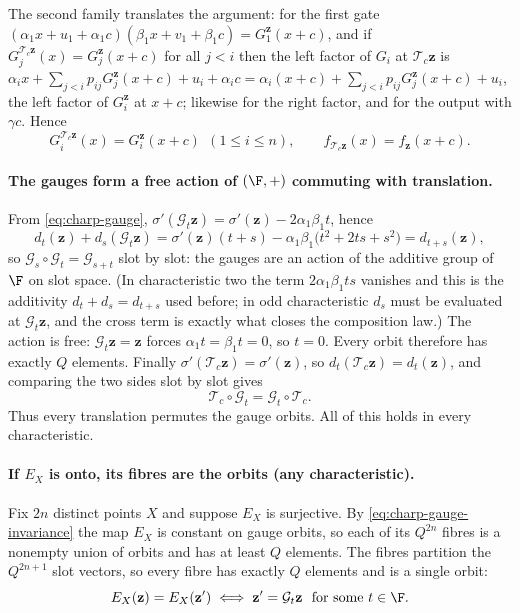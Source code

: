 The second family translates the argument: for the first gate
$(\alpha_1x+u_1+\alpha_1c)(\beta_1x+v_1+\beta_1c)=G_1^{\mathbf z}(x+c)$, and if
$G_j^{\mathcal T_c\mathbf z}(x)=G_j^{\mathbf z}(x+c)$ for all $j<i$ then the left factor of
$G_i$ at $\mathcal T_c\mathbf z$ is
$\alpha_ix+\sum_{j<i}p_{ij}G_j^{\mathbf z}(x+c)+u_i+\alpha_ic
=\alpha_i(x+c)+\sum_{j<i}p_{ij}G_j^{\mathbf z}(x+c)+u_i$, the left factor of $G_i^{\mathbf z}$
at $x+c$; likewise for the right factor, and for the output with $\gamma c$.  Hence
\begin{equation}
   G_i^{\mathcal T_c\mathbf z}(x)=G_i^{\mathbf z}(x+c)\ \ (1\le i\le n),
   \qquad
   f_{\mathcal T_c\mathbf z}(x)=f_{\mathbf z}(x+c).
   \label{eq:charp-translation}
\end{equation}

\paragraph{The gauges form a free action of $(\F,+)$ commuting with translation.}
From \eqref{eq:charp-gauge},
$\sigma'(\mathcal G_t\mathbf z)=\sigma'(\mathbf z)-2\alpha_1\beta_1t$, hence
\[
   d_t(\mathbf z)+d_s(\mathcal G_t\mathbf z)
   =\sigma'(\mathbf z)(t+s)-\alpha_1\beta_1\bigl(t^2+2ts+s^2\bigr)
   =d_{t+s}(\mathbf z),
\]
so $\mathcal G_s\circ\mathcal G_t=\mathcal G_{s+t}$ slot by slot: the gauges are an action
of the additive group of $\F$ on slot space.  (In characteristic two the term
$2\alpha_1\beta_1ts$ vanishes and this is the additivity $d_t+d_s=d_{t+s}$ used before; in
odd characteristic $d_s$ must be evaluated at $\mathcal G_t\mathbf z$, and the cross term
is exactly what closes the composition law.)  The action is free: $\mathcal G_t\mathbf
z=\mathbf z$ forces $\alpha_1t=\beta_1t=0$, so $t=0$.  Every orbit therefore has exactly
$Q$ elements.  Finally $\sigma'(\mathcal T_c\mathbf z)=\sigma'(\mathbf z)$, so
$d_t(\mathcal T_c\mathbf z)=d_t(\mathbf z)$, and comparing the two sides slot by slot gives
\begin{equation}
   \mathcal T_c\circ\mathcal G_t=\mathcal G_t\circ\mathcal T_c .
   \label{eq:charp-commute}
\end{equation}
Thus every translation permutes the gauge orbits.  All of this holds in every
characteristic.

\paragraph{If $E_X$ is onto, its fibres are the orbits (any characteristic).}
Fix $2n$ distinct points $X$ and suppose $E_X$ is surjective.  By
\eqref{eq:charp-gauge-invariance} the map $E_X$ is constant on gauge orbits, so each of its
$Q^{2n}$ fibres is a nonempty union of orbits and has at least $Q$ elements.  The fibres
partition the $Q^{2n+1}$ slot vectors, so every fibre has exactly $Q$ elements and is a
single orbit:
\begin{equation}
   E_X(\mathbf z)=E_X(\mathbf z')
   \iff
   \mathbf z'=\mathcal G_t\mathbf z\ \text{ for some } t\in\F .
   \label{eq:charp-fibres}
\end{equation}

